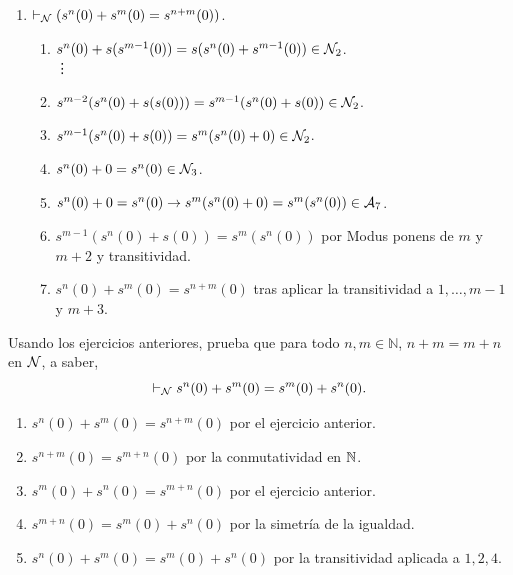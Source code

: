 \begin{ejercicio}
\begin{enumerate}
        Como $n=m$, y $s$ es una aplicación, se tiene que $s^n(0)$ y $s^m(0)$ son el mismo elemento. Por lo tanto:
        \begin{enumerate}[label=\arabic*.]
            \item $s^n(0) = s^m(0)\in \cc{A}_6$.
        \end{enumerate}~
        \item $\vdash_{\mathcal{N}} (s^n(0) + s^m(0) = s^{n+m}(0))$.
        \begin{enumerate}[label=\arabic*.]
            \item $s^{n}(0)+ s(s^{m-1}(0)) = s(s^{n}(0)+s^{m-1}(0))\in \mathcal{N}_2$.\\
            \vdots
            \item[$m-1$.] $s^{m-2}(s^{n}(0)+s(s(0))) = s^{m-1}(s^{n}(0)+s(0))\in \mathcal{N}_2$.
            \item[$m$.] $s^{m-1}(s^{n}(0)+s(0))=s^{m}(s^{n}(0)+0)\in \mathcal{N}_2$.
            \item[$m+1$.] $s^{n}(0)+0=s^n(0)\in \mathcal{N}_3$.
            \item[$m+2$.] $s^{n}(0)+0=s^n(0) \to s^{m}(s^{n}(0)+0)=s^m(s^n(0))\in \mathcal{A}_7$.
            \item[$m+3$.] $s^{m-1}(s^{n}(0)+s(0))=s^{m}(s^{n}(0))$ por Modus ponens de $m$ y $m+2$ y transitividad.
            \item[$m+4$.] $s^n(0) + s^m(0) = s^{n+m}(0)$ tras aplicar la transitividad a $1,\dots,m-1$ y $m+3$.
        \end{enumerate}
    \end{enumerate}
\end{ejercicio}

\begin{ejercicio}
    Usando los ejercicios anteriores, prueba que para todo $n, m \in \mathbb{N}$, $n + m = m + n$ en $\mathcal{N}$, a saber,
    \[
        \vdash_{\mathcal{N}} s^n(0) + s^m(0) = s^m(0) + s^n(0).
    \]
    \begin{enumerate}
        \item $s^n(0) + s^m(0)=s^{n+m}(0)$ por el ejercicio anterior.
        \item $s^{n+m}(0)=s^{m+n}(0)$ por la conmutatividad en $\mathbb{N}$.
        \item $s^m(0) + s^n(0)=s^{m+n}(0)$ por el ejercicio anterior.
        \item $s^{m+n}(0)=s^m(0) + s^n(0)$ por la simetría de la igualdad.
        \item $s^n(0) + s^m(0)=s^m(0) + s^n(0)$ por la transitividad aplicada a $1,2,4$.
    \end{enumerate}
\end{ejercicio}
